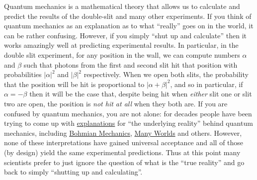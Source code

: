 Quantum mechanics is a mathematical theory that allows us to calculate
and predict the results of the double-slit and many other experiments.
If you think of quantum mechanics as an explanation as to what
``really'' goes on in the world, it can be rather confusing. However, if
you simply ``shut up and calculate'' then it works amazingly well at
predicting experimental results. In particular, in the double slit
experiment, for any position in the wall, we can compute numbers
\(\alpha\) and \(\beta\) such that photons from the first and second
slit hit that position with probabilities \(|\alpha|^2\) and
\(|\beta|^2\) respectively. When we open both slits, the probability
that the position will be hit is proportional to \(|\alpha+\beta|^2\),
and so in particular, if \(\alpha=-\beta\) then it will be the case
that, despite being hit when \emph{either} slit one or slit two are
open, the position is \emph{not hit at all} when they both are. If you
are confused by quantum mechanics, you are not alone: for decades people
have been trying to come up with
\href{https://en.wikipedia.org/wiki/Interpretations_of_quantum_mechanics}{explanations}
for ``the underlying reality'' behind quantum mechanics, including
\href{https://en.wikipedia.org/wiki/De_Broglie\%E2\%80\%93Bohm_theory}{Bohmian
Mechanics},
\href{https://en.wikipedia.org/wiki/Many-worlds_interpretation}{Many
Worlds} and others. However, none of these interpretations have gained
universal acceptance and all of those (by design) yield the same
experimental predictions. Thus at this point many scientists prefer to
just ignore the question of what is the ``true reality'' and go back to
simply ``shutting up and calculating''.

\hypertarget{complexrem}{}


